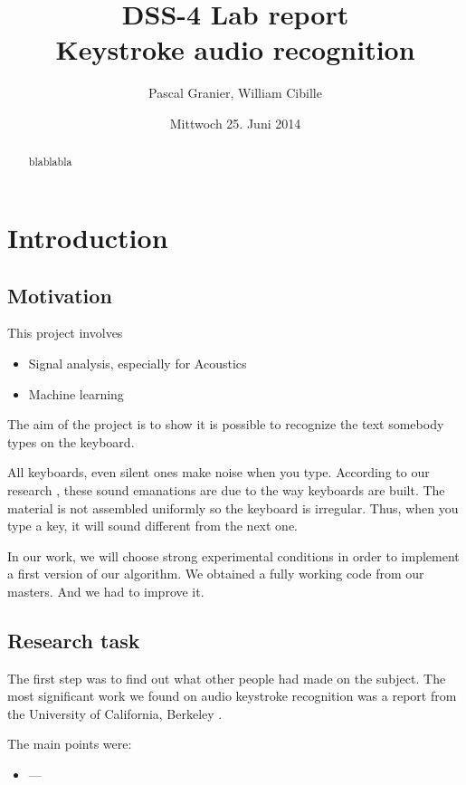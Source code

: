 \documentclass[12pt,a4paper]{article}
\author{Pascal Granier, William Cibille}
\title{DSS-4 Lab report\\
Keystroke audio recognition}
\date{Mittwoch 25. Juni 2014}
\begin{document}
\maketitle

\begin{abstract}
blablabla
\end{abstract}

\tableofcontents
\newpage

\section*{Introduction}


\subsection{Motivation}

This project involves
\begin{itemize}
\item Signal analysis, especially for Acoustics
\item Machine learning
\end{itemize}
The aim of the project is to show it is possible to recognize the text somebody types on the keyboard. 

All keyboards, even silent ones make noise when you type. According to our research \cite{Zhuang}, these sound emanations are due to the way keyboards are built. The material is not assembled uniformly so the keyboard is irregular. Thus, when you type a key, it will sound different from the next one. 

In our work, we will choose strong experimental conditions in order to implement a first version of our algorithm. We obtained a fully working code from our masters. And we had to improve it. 

\subsection{Research task}

The first step was to find out what other people had made on the subject. The most significant work we found on audio keystroke recognition was a report from the University of California, Berkeley \cite{Zhuang}. 

The main points were:
\begin{itemize}
\item ---
\end{itemize}
\end{document}
